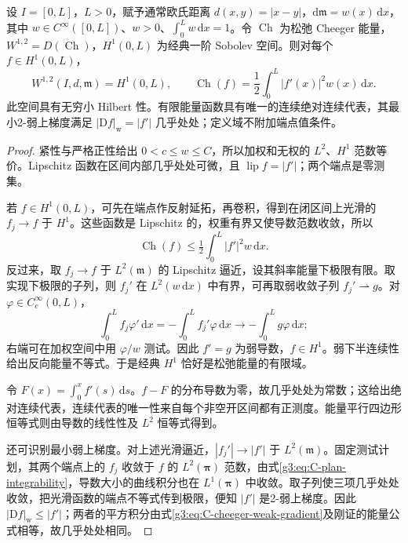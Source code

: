 \begin{theorem}\label{g3:thm:C-weighted-interval-energy}
	设 \(I=[0,L]\)，\(L>0\)，赋予通常欧氏距离 \(d(x,y)=|x-y|\)，\(\mathrm d\mathfrak m=w(x)\,\mathrm dx\)，其中 \(w\in C^\infty([0,L])\)、\(w>0\)、\(\int_0^Lw\,\mathrm dx=1\)。令 \(\operatorname{Ch}\) 为松弛 Cheeger 能量，\(W^{1,2}=D(\operatorname{Ch})\)，\(H^1(0,L)\) 为经典一阶 Sobolev 空间。则对每个 \(f\in H^1(0,L)\)，
	\[
		W^{1,2}(I,d,\mathfrak m)=H^1(0,L),\qquad
		\operatorname{Ch}(f)=\frac12\int_0^L|f'(x)|^2w(x)\,\mathrm dx.
	\]
	此空间具有无穷小 Hilbert 性。有限能量函数具有唯一的连续绝对连续代表，其最小2-弱上梯度满足 \(|\mathrm Df|_{\mathrm w}=|f'|\) 几乎处处；定义域不附加端点值条件。
\end{theorem}
\begin{proof}
	紧性与严格正性给出 \(0<c\le w\le C\)，所以加权和无权的 \(L^2\)、\(H^1\) 范数等价。Lipschitz 函数在区间内部几乎处处可微，且 \(\operatorname{lip}f=|f'|\)；两个端点是零测集。

	若 \(f\in H^1(0,L)\)，可先在端点作反射延拓，再卷积，得到在闭区间上光滑的 \(f_j\to f\) 于 \(H^1\)。这些函数是 Lipschitz 的，权重有界又使导数范数收敛，所以
	\[
		\operatorname{Ch}(f)\le\tfrac12\int_0^L|f'|^2w\,\mathrm dx.
	\]
	反过来，取 \(f_j\to f\) 于 \(L^2(\mathfrak m)\) 的 Lipschitz 逼近，设其斜率能量下极限有限。取实现下极限的子列，则 \(f_j'\) 在 \(L^2(w\,\mathrm dx)\) 中有界，可再取弱收敛子列 \(f_j'\rightharpoonup g\)。对 \(\varphi\in C_c^\infty(0,L)\)，
	\[
		\int_0^Lf_j\varphi'\,\mathrm dx
		=-\int_0^Lf_j'\varphi\,\mathrm dx
		\longrightarrow-\int_0^Lg\varphi\,\mathrm dx;
	\]
	右端可在加权空间中用 \(\varphi/w\) 测试。因此 \(f'=g\) 为弱导数，\(f\in H^1\)。弱下半连续性给出反向能量不等式。于是经典 \(H^1\) 恰好是松弛能量的有限域。

	令 \(F(x)=\int_0^xf'(s)\,\mathrm ds\)。\(f-F\) 的分布导数为零，故几乎处处为常数；这给出绝对连续代表，连续代表的唯一性来自每个非空开区间都有正测度。能量平行四边形恒等式则由导数的线性性及 \(L^2\) 恒等式得到。

	还可识别最小弱上梯度。对上述光滑逼近，\(|f_j'|\to|f'|\) 于 \(L^2(\mathfrak m)\)。固定测试计划，其两个端点上的 \(f_j\) 收敛于 \(f\) 的 \(L^2(\boldsymbol\pi)\) 范数，由式\eqref{g3:eq:C-plan-integrability}，导数大小的曲线积分也在 \(L^1(\boldsymbol\pi)\) 中收敛。取子列使三项几乎处处收敛，把光滑函数的端点不等式传到极限，便知 \(|f'|\) 是2-弱上梯度。因此 \(|\mathrm Df|_{\mathrm w}\le|f'|\)；两者的平方积分由式\eqref{g3:eq:C-cheeger-weak-gradient}及刚证的能量公式相等，故几乎处处相同。
\end{proof}

